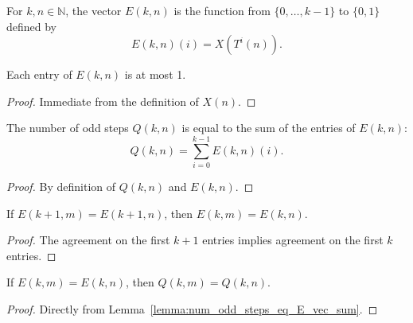 \begin{definition}\label{def:E_vec}\leanok
For $k, n \in \mathbb{N}$, the vector $E(k, n)$ is the function from $\{0, \dots, k-1\}$ to $\{0, 1\}$ defined by
\begin{equation}
    E(k, n)(i) = X(T^i(n)).
\end{equation}
\end{definition}

\begin{lemma}\label{lemma:E_vec_le_one}\leanok
Each entry of $E(k, n)$ is at most 1.
\end{lemma}
\begin{proof}\leanok
Immediate from the definition of $X(n)$.
\end{proof}

\begin{lemma}\label{lemma:num_odd_steps_eq_E_vec_sum}\leanok
The number of odd steps $Q(k, n)$ is equal to the sum of the entries of $E(k, n)$:
\begin{equation}
    Q(k, n) = \sum_{i=0}^{k-1} E(k, n)(i).
\end{equation}
\end{lemma}
\begin{proof}\leanok
By definition of $Q(k, n)$ and $E(k, n)$.
\end{proof}

\begin{lemma}\label{lemma:E_vec_restrict}\leanok
If $E(k+1, m) = E(k+1, n)$, then $E(k, m) = E(k, n)$.
\end{lemma}
\begin{proof}\leanok
The agreement on the first $k+1$ entries implies agreement on the first $k$ entries.
\end{proof}

\begin{lemma}\label{lemma:num_odd_steps_eq_of_E_vec_eq}\leanok
If $E(k, m) = E(k, n)$, then $Q(k, m) = Q(k, n)$.
\end{lemma}
\begin{proof}\leanok
Directly from Lemma~\ref{lemma:num_odd_steps_eq_E_vec_sum}.
\end{proof}
